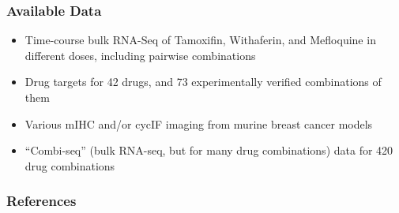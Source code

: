 \documentclass{beamer}
\begin{document}
\begin{frame}
  \frametitle{Available Data}
  \begin{itemize}
    \item Time-course bulk RNA-Seq of Tamoxifin, Withaferin, and Mefloquine in different doses, including pairwise combinations 
    \item Drug targets for 42 drugs, and 73 experimentally verified combinations of them 
    \item Various mIHC and/or cycIF imaging from murine breast cancer models 
    \item \alert{``Combi-seq'' (bulk RNA-seq, but for many drug combinations) data for 420 drug combinations}~\cite{Mathur2022}
  \end{itemize}
\end{frame}

\medskip

\begin{frame}[allowframebreaks]
  \frametitle{References}
  
\end{frame}
\end{document}
